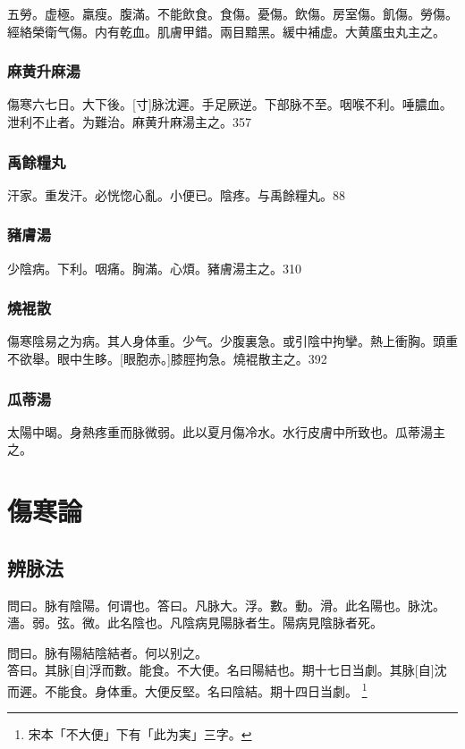 \documentclass[12pt,oneside,UTF8,b5paper]{ctexbook}她她她她她她她
\begin{document}
五勞。虚極。羸瘦。腹滿。不能飲食。食傷。憂傷。飲傷。房室傷。飢傷。勞傷。經絡榮衛气傷。内有乾血。肌膚甲錯。兩目黯黑。緩中補虚。大黄䗪虫丸主之。

\section{麻黄升麻湯}

傷寒六七日。大下後。[寸]脉沈遲。手足厥逆。下部脉不至。咽喉不利。唾膿血。泄利不止者。为難治。麻黄升麻湯主之。357

\section{禹餘糧丸}

汗家。重发汗。必恍惚心亂。小便已。陰疼。与禹餘糧丸。88

\section{豬膚湯}

少陰病。下利。咽痛。胸滿。心煩。豬膚湯主之。310

\section{燒裩散}

傷寒陰易之为病。其人身体重。少气。少腹裏急。或引陰中拘攣。熱上衝胸。頭重不欲舉。眼中生眵。[眼胞赤。]膝脛拘急。燒裩散主之。392

\section{瓜蒂湯}

太陽中暍。身熱疼重而脉微弱。此以夏月傷冷水。水行皮膚中所致也。瓜蒂湯主之。

\part{傷寒論}

\chapter{辨脉法}

問曰。脉有陰陽。何谓也。答曰。凡脉大。浮。數。動。滑。此名陽也。脉沈。濇。弱。弦。微。此名陰也。凡陰病見陽脉者生。陽病見陰脉者死。

問曰。脉有陽結陰結者。何以别之。\\
答曰。其脉[自]浮而數。能食。不大便。名曰陽結也。期十七日当劇。其脉[自]沈而遲。不能食。身体重。大便反堅。名曰陰結。期十四日当劇。
	\footnote{宋本「不大便」下有「此为実」三字。}
\end{document}
